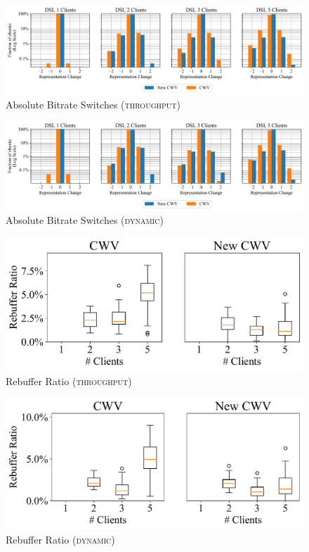 \documentclass[10pt,sigconf]{acmart}
\begin{document}
\begin{figure}
  \centering
  \includegraphics[width=\textwidth, keepaspectratio]{figures/bitrate_derivative_distribution.pdf}
  \caption{Absolute Bitrate Switches (\textsc{throughput})}
  \label{fig:bitrate-switches}
\end{figure}

\begin{figure}
  \centering
  \includegraphics[width=\textwidth, keepaspectratio]{figures/bitrate_derivative_distribution_dynamic.pdf}
  \caption{Absolute Bitrate Switches (\textsc{dynamic})}
  \label{fig:bitrate-switches-dynamic}
\end{figure}


\begin{figure}
      \includegraphics[width=.45\textwidth, keepaspectratio]{figures/Rebuffer_Ratio.pdf}
    \caption{Rebuffer Ratio (\textsc{throughput})}
    \label{fig:rebuffer-ratio}
\end{figure}

\begin{figure}
  \includegraphics[width=.45\textwidth, keepaspectratio]{figures/Rebuffer_Ratio_dynamic.pdf}
\caption{Rebuffer Ratio (\textsc{dynamic})}
\label{fig:rebuffer-ratio-dynamic}
\end{figure}
\end{document}
